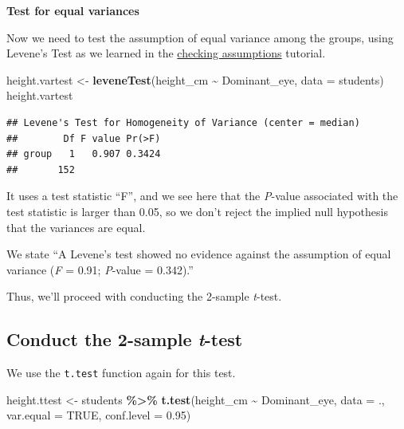 \documentclass[
]{book}
\newenvironment{Shaded}{\begin{snugshade}}{\end{snugshade}}
\newcommand{\AttributeTok}[1]{\textcolor[rgb]{0.13,0.29,0.53}{#1}}
\newcommand{\ConstantTok}[1]{\textcolor[rgb]{0.56,0.35,0.01}{#1}}
\newcommand{\FloatTok}[1]{\textcolor[rgb]{0.00,0.00,0.81}{#1}}
\newcommand{\FunctionTok}[1]{\textcolor[rgb]{0.13,0.29,0.53}{\textbf{#1}}}
\newcommand{\NormalTok}[1]{#1}
\newcommand{\OtherTok}[1]{\textcolor[rgb]{0.56,0.35,0.01}{#1}}
\newcommand{\SpecialCharTok}[1]{\textcolor[rgb]{0.81,0.36,0.00}{\textbf{#1}}}
\begin{document}
\textbf{Test for equal variances}

Now we need to test the assumption of equal variance among the groups, using Levene's Test as we learned in the \hyperref[levenetest]{checking assumptions} tutorial.

\begin{Shaded}
\begin{Highlighting}[]
\NormalTok{height.vartest }\OtherTok{\textless{}{-}} \FunctionTok{leveneTest}\NormalTok{(height\_cm }\SpecialCharTok{\textasciitilde{}}\NormalTok{ Dominant\_eye, }\AttributeTok{data =}\NormalTok{ students)}
\NormalTok{height.vartest}
\end{Highlighting}
\end{Shaded}

\begin{verbatim}
## Levene's Test for Homogeneity of Variance (center = median)
##        Df F value Pr(>F)
## group   1   0.907 0.3424
##       152
\end{verbatim}

It uses a test statistic ``F'', and we see here that the \emph{P}-value associated with the test statistic is larger than 0.05, so we don't reject the implied null hypothesis that the variances are equal.

We state ``A Levene's test showed no evidence against the assumption of equal variance (\emph{F} = 0.91; \emph{P}-value = 0.342).''

Thus, we'll proceed with conducting the 2-sample \emph{t}-test.

\subsection{\texorpdfstring{Conduct the 2-sample \emph{t}-test}{Conduct the 2-sample t-test}}\label{conduct_2samptest}

We use the \texttt{t.test} function again for this test.

\begin{Shaded}
\begin{Highlighting}[]
\NormalTok{height.ttest }\OtherTok{\textless{}{-}}\NormalTok{ students }\SpecialCharTok{\%\textgreater{}\%}
  \FunctionTok{t.test}\NormalTok{(height\_cm }\SpecialCharTok{\textasciitilde{}}\NormalTok{ Dominant\_eye, }
         \AttributeTok{data =}\NormalTok{ ., }\AttributeTok{var.equal =} \ConstantTok{TRUE}\NormalTok{, }\AttributeTok{conf.level =} \FloatTok{0.95}\NormalTok{)}
\end{Highlighting}
\end{Shaded}
\end{document}
